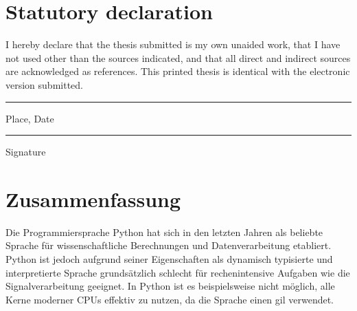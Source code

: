 


\renewcommand{\sectionmark}[1]{\markright{\thesection.\ #1}}
\renewcommand{\headrulewidth}{0.4pt}
\renewcommand*\MakeUppercase[1]{#1}
\fancyhead[L]{\leftmark}
\fancyhead[R]{\thepage}
\fancyfoot[C]{}
\pagestyle{fancy}

\makeatletter
\renewcommand*\tableofcontents{\@starttoc{toc}}
\makeatother

\newpage
\section*{Statutory declaration}
I hereby declare that the thesis submitted is my own unaided work, that I have not used other than the sources indicated, and that all direct and indirect sources are acknowledged as references.
This printed thesis is identical with the electronic version submitted.

\vspace{2.5cm}
\parbox{4cm}{\hrule
\strut \footnotesize Place, Date} \hfill\parbox{4cm}{\hrule
\strut \footnotesize Signature}

\section*{Zusammenfassung}

Die Programmiersprache Python hat sich in den letzten Jahren als beliebte Sprache für wissenschaftliche Berechnungen und Datenverarbeitung etabliert.
Python ist jedoch aufgrund seiner Eigenschaften als dynamisch typisierte und interpretierte Sprache grundsätzlich schlecht für rechenintensive Aufgaben wie die Signalverarbeitung geeignet. In Python ist es beispielsweise nicht möglich, alle Kerne moderner CPUs effektiv zu nutzen, da die Sprache einen \acrfull{gil} verwendet.


